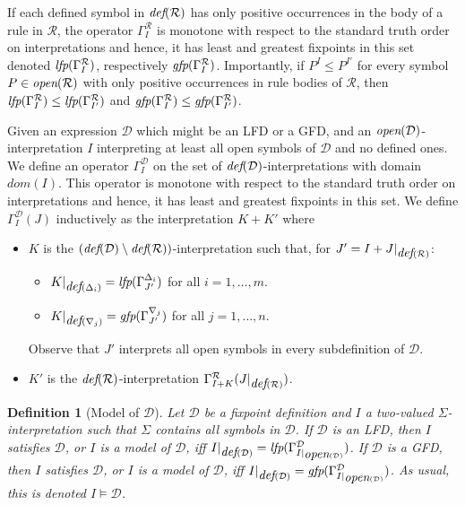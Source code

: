 \documentclass{tlp}
\newcommand{\FD}{\ensuremath{\mathcal{D}}\xspace}
\newcommand{\LFD}{\ensuremath{\Delta}\xspace}
\newcommand{\GFD}{\ensuremath{\nabla}\xspace}
\newcommand{\defp}[1]{\ensuremath{\mbox{\it def}(#1)}\xspace}
\newcommand{\openp}[1]{\ensuremath{\mbox{\it open}(#1)}\xspace}
\newcommand{\Op}[2]{\ensuremath{\Gamma_{#1}^{#2}}}
\newcommand{\lfp}[1]{\ensuremath{\mbox{\it lfp}(#1)}\xspace}
\newcommand{\gfp}[1]{\ensuremath{\mbox{\it gfp}(#1)}\xspace}
\newcommand{\Voc}{\ensuremath{\Sigma}\xspace}
\newcommand{\Rules}{\ensuremath{\mathcal{R}}\xspace}
\newtheorem{definition}[lemma]{Definition}
\begin{document}
If each defined symbol in $\defp{\Rules}$ has only positive occurrences in the body of a rule in $\Rules$, the operator $\Op{I}{\Rules}$ is monotone with respect to the standard truth order on interpretations and hence, it has least and greatest fixpoints in this set denoted $\lfp{\Op{I}{\Rules}}$, respectively $\gfp{\Op{I}{\Rules}}$. Importantly, if $P^I \leq P^{I'}$ for every symbol $P\in\openp{\Rules}$ with only positive occurrences in rule bodies of $\Rules$, then $\lfp{\Op{I}{\Rules}}\leq \lfp{\Op{I'}{\Rules}}$ and $\gfp{\Op{I}{\Rules}}\leq \gfp{\Op{I'}{\Rules}}$.

Given an expression $\FD$ which might be an LFD or a GFD, and an $\openp{\FD}$-interpretation $I$ interpreting at least all open symbols of $\FD$ and no defined ones. We define an operator $\Op{I}{\FD}$ on the set of $\defp{\FD}$-interpretations with domain $dom(I)$. This operator is monotone with respect to the standard truth order on interpretations and hence, it has least and greatest fixpoints in this set. We define $\Op{I}{\FD}(J)$ inductively as the interpretation $K+K'$ where
\begin{itemize}
\item $K$ is the $(\defp{\FD}\setminus\defp{\Rules})$-interpretation
  such that, for $J' =
  I+J|_{\defp{\Rules}}$:
  \begin{itemize}
  \item  $K|_{\defp{\LFD_i}} = \lfp{\Op{J'}{\LFD_i}}$ for all $i= 1, \ldots, m$.
  \item $K|_{\defp{\GFD_j}} = \gfp{\Op{J'}{\GFD_j}}$ for all $j=1, \ldots, n$.
\end{itemize}
Observe that $J'$ interprets all open symbols in every
subdefinition of $\FD$.
\item $K'$ is the $\defp{\Rules}$-interpretation $\Op{I+K}{\Rules}(J|_{\defp{\Rules}})$.
\end{itemize}

\begin{definition}[Model of $\FD$]
Let $\FD$ be a fixpoint definition and $I$ a two-valued $\Voc$-interpretation such
that $\Voc$ contains all symbols in $\FD$. If $\FD$ is an LFD, then $I$ {\em satisfies} $\FD$, or $I$ is a {\em model} of $\FD$, iff $I|_{\defp{\FD}} =
\lfp{\Op{I|_{\openp{\FD}}}{\FD}}$. If $\FD$ is a GFD, then $I$ {\em satisfies} $\FD$, or $I$ is a {\em model} of $\FD$, iff $I|_{\defp{\FD}} = \gfp{\Op{I|_{\openp{\FD}}}{\FD}}$. As usual, this is denoted $I \models \FD$.
\end{definition}
\end{document}
